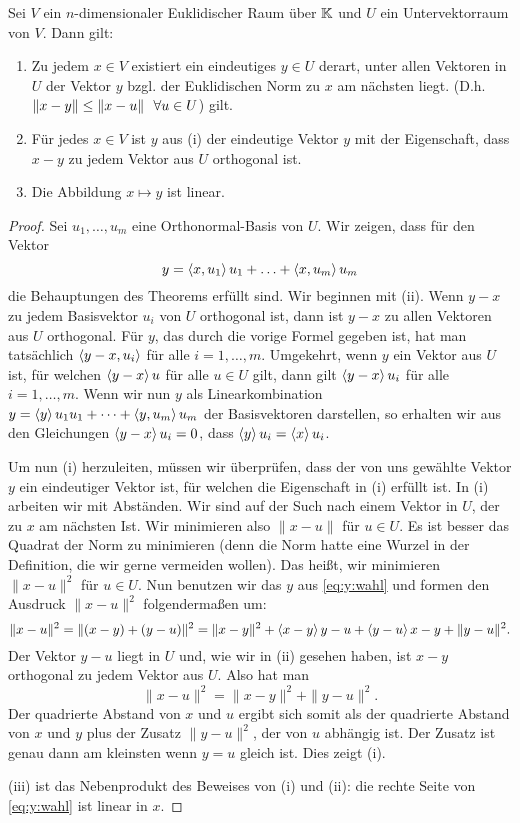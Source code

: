 \begin{thm}
	Sei $ V $ ein $ n $-dimensionaler Euklidischer Raum über $ \mathbb K $ und $ U $ ein Untervektorraum von $ V $. Dann gilt:
	\begin{enumerate}
		\item
			Zu jedem $ x \in V $ existiert ein eindeutiges $ y \in U $ derart, unter allen Vektoren in $U$ der Vektor $y$ bzgl. der Euklidischen Norm zu $x$ am nächsten liegt.  (D.h. $ \left\| x-y \right\| \leq \left\| x-u \right\| \enspace \forall u \in U $) gilt.
		\item
			Für jedes $x \in V$ ist $y$ aus (i) der eindeutige Vektor $y$ mit der Eigenschaft, dass $ x- y$ zu jedem Vektor aus $ U $ orthogonal ist.
		\item
			Die Abbildung $x \mapsto y$ ist linear. 
	\end{enumerate}
\end{thm}
\begin{proof}
	Sei $ u_1, \ldots, u_m $ eine Orthonormal-Basis von $ U $. Wir zeigen, dass für den Vektor
	\begin{equation}\label{eq:y:wahl} 
	y = \left\langle x,u_1 \right\rangle u_1 + \ldots + \left\langle x,u_m \right\rangle u_m
	\end{equation}
	die Behauptungen des Theorems erfüllt sind. Wir beginnen mit (ii). Wenn $y-x$ zu jedem Basisvektor $u_i$ von $U$ orthogonal ist, dann ist $y-x$ zu allen Vektoren aus $U$ orthogonal. Für $y$, das durch die vorige Formel gegeben ist, hat man tatsächlich $\left\langle y-x,u_i \right\rangle$ für alle $i=1,\ldots,m$. Umgekehrt, wenn $y$ ein Vektor aus $U$ ist, für welchen $\left\langle y-x \right\rangle{u}$ für alle $u \in U$ gilt, dann gilt $\left\langle y-x \right\rangle{u_i}$ für alle $i=1,\ldots,m$. Wenn wir nun $y$ als Linearkombination $y = \left\langle y \right\rangle{u_1} u_1 + \cdots + \left\langle y,u_m \right\rangle u_m$ der Basisvektoren darstellen, so erhalten wir aus den Gleichungen $\left\langle y-x \right\rangle{u_i} =0$, dass $\left\langle y \right\rangle{u_i} = \left\langle x \right\rangle{u_i}$. 
	
	Um nun (i) herzuleiten, müssen wir überprüfen, dass der von uns gewählte Vektor $y$ ein eindeutiger Vektor ist, für welchen die Eigenschaft in (i) erfüllt ist. In (i) arbeiten wir mit Abständen. Wir sind auf der Such nach einem Vektor in $U$, der zu $x$ am nächsten Ist. Wir minimieren also $\|x-u\|$ für $u \in U$. Es ist besser das Quadrat der Norm zu minimieren (denn die Norm hatte eine Wurzel in der Definition, die wir gerne vermeiden wollen). Das heißt, wir minimieren $\|x-u\|^2$ für $u \in U$. Nun benutzen wir das $y$ aus \eqref{eq:y:wahl} und formen den Ausdruck $\|x-u\|^2$ folgendermaßen um: 
	\[
		\|x-u\|^2= \| (x-y) + (y-u)\|^2 = \|x-y\|^2 + \left\langle x-y \right\rangle{y-u} + \left\langle y-u \right\rangle{x-y} + \|y - u\|^2.
	\]
	Der Vektor $y-u$ liegt in $U$ und, wie wir in (ii) gesehen haben, ist $x-y$ orthogonal zu jedem Vektor aus $U$. Also hat man 
	\[
		\|x-u\|^2 = \|x-y\|^2 + \|y - u\|^2.
	\]
	Der quadrierte Abstand von $x$ und $u$ ergibt sich somit als der quadrierte Abstand von $x$ und $y$ plus der Zusatz $\|y - u\|^2$, der von $u$ abhängig ist. Der Zusatz ist genau dann am kleinsten wenn $y = u$ gleich ist. Dies zeigt (i). 
	
	
	(iii) ist das Nebenprodukt des Beweises von (i) und (ii): die rechte Seite von \eqref{eq:y:wahl} ist linear in $x$. 
\end{proof}

